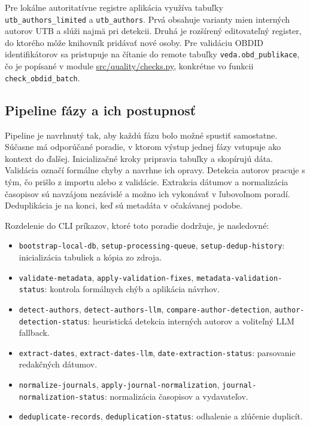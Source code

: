 Pre lokálne autoritatívne registre aplikácia využíva tabuľky \texttt{utb\_authors\_limited} a \texttt{utb\_authors}. Prvá obsahuje varianty mien interných autorov UTB a slúži najmä pri detekcii. Druhá je rozšírený editovateľný register, do ktorého môže knihovník pridávať nové osoby. Pre validáciu OBDID identifikátorov sa pristupuje na čítanie do remote tabuľky \texttt{veda.obd\_publikace}, čo je popísané v module \href{src/quality/checks.py}{src/quality/checks.py}, konkrétne vo funkcii \texttt{check\_obdid\_batch}.

\subsection{Pipeline fázy a ich postupnosť}

Pipeline je navrhnutý tak, aby každú fázu bolo možné spustiť samostatne. Súčasne má odporúčané poradie, v ktorom výstup jednej fázy vstupuje ako kontext do ďalšej. Inicializačné kroky pripravia tabuľky a skopírujú dáta. Validácia označí formálne chyby a navrhne ich opravy. Detekcia autorov pracuje s tým, čo prišlo z importu alebo z validácie. Extrakcia dátumov a normalizácia časopisov sú navzájom nezávislé a možno ich vykonávať v ľubovoľnom poradí. Deduplikácia je na konci, keď sú metadáta v očakávanej podobe.

Rozdelenie do CLI príkazov, ktoré toto poradie dodržuje, je nasledovné:

\begin{itemize}
    \item \texttt{bootstrap-local-db}, \texttt{setup-processing-queue}, \texttt{setup-dedup-history}: inicializácia tabuliek a kópia zo zdroja.
    \item \texttt{validate-metadata}, \texttt{apply-validation-fixes}, \texttt{metadata-validation-status}: kontrola formálnych chýb a aplikácia návrhov.
    \item \texttt{detect-authors}, \texttt{detect-authors-llm}, \texttt{compare-author-detection}, \texttt{author-detection-status}: heuristická detekcia interných autorov a voliteľný LLM fallback.
    \item \texttt{extract-dates}, \texttt{extract-dates-llm}, \texttt{date-extraction-status}: parsovanie redakčných dátumov.
    \item \texttt{normalize-journals}, \texttt{apply-journal-normalization}, \texttt{journal-normalization-status}: normalizácia časopisov a vydavateľov.
    \item \texttt{deduplicate-records}, \texttt{deduplication-status}: odhalenie a zlúčenie duplicít.
\end{itemize}

